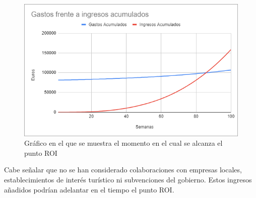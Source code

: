 \begin{figure}[H]
    \centering
    \includegraphics[width=1\textwidth]{Memoria_TFG_LaTeX/images/puntoROI.png}
    \caption{Gráfico en el que se muestra el momento en el cual se alcanza el punto ROI}
    \label{fig:puntoROI}
\end{figure}

Cabe señalar que no se han considerado colaboraciones con empresas locales, establecimientos de interés turístico ni subvenciones del gobierno. Estos ingresos añadidos podrían adelantar en el tiempo el punto ROI.